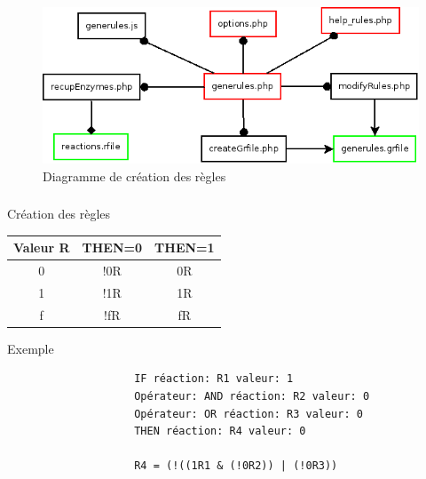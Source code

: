 \documentclass{beamer}
\begin{document}
\begin{frame}
	\frametitle{\hspace{1cm}\textcolor{bleu2}{\secname}}
	\begin{figure}[!ht]
		\begin{center}
			\includegraphics[scale=0.5]{../WRET/Diagramme/generules.png}  
			\caption{Diagramme de création des règles}
  		\end{center}	
	\end{figure}
\end{frame}

\begin{frame}[fragile]
	\frametitle{\hspace{1cm}\textcolor{bleu2}{\secname}}
	\begin{block}{\hspace{0.2cm}Création des règles}
		\hspace{1cm}
		\begin{center}
			\begin{tabular}{|c|c|c|}
				\hline
				Valeur R & THEN=0 & THEN=1\\ \hline
				0 & !0R & 0R\\ \hline
				1 & !1R & 1R\\ \hline
				f & !fR & fR\\ \hline
			\end{tabular}
		\end{center}
	\end{block}
	\begin{block}{\hspace{0.2cm}Exemple}
		\begin{center}
			\begin{minipage}[c]{0.8\textwidth}
				\hspace{2cm}
				\begin{verbatim}
					IF réaction: R1 valeur: 1
					Opérateur: AND réaction: R2 valeur: 0
					Opérateur: OR réaction: R3 valeur: 0
					THEN réaction: R4 valeur: 0

					R4 = (!((1R1 & (!0R2)) | (!0R3))
				\end{verbatim}
			\end{minipage}
		\end{center}
	\end{block}
\end{frame}
\end{document}
